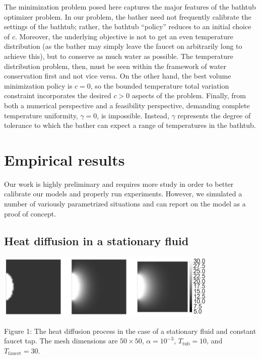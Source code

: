 \documentclass[12pt]{amsart}
\begin{document}
The minimization problem posed here captures the major features of the bathtub
optimizer problem. In our problem, the bather need not frequently calibrate the
settings of the bathtub; rather, the bathtub ``policy'' reduces to an initial
choice of $c$. Moreover, the underlying objective is not to get an even temperature
distribution (as the bather may simply leave the faucet on arbitrarily long to
achieve this), but to conserve as much water as possible. The temperature
distribution problem, then, must be seen within the framework of water
conservation first and not vice versa. On the other hand, the best volume
minimization policy is $c=0$, so the bounded temperature total variation
constraint incorporates the desired $c > 0$ aspects of the problem. Finally,
from both a numerical perspective and a feasibility perspective, demanding
complete temperature uniformity, $\gamma = 0$, is impossible. Instead, $\gamma$
represents the degree of tolerance to which the bather can expect a range of
temperatures in the bathtub.

\section{Empirical results}

Our work is highly preliminary and requires more study in order to better
calibrate our models and properly run experiments. However, we simulated a
number of variously parametrized situations and can report on the model as a
proof of concept.

\subsection{Heat diffusion in a stationary fluid}

\begin{center}
\includegraphics[width=0.8\textwidth]{../plots/diffusion-01.png}

\justify
\footnotesize{
Figure 1: The heat diffusion process in the case of a stationary fluid and
constant faucet tap. The mesh
dimensions are $50 \times 50$, $\alpha = 10^{-3}$, $T_{\mathrm{tub}} = 10$, and
$T_{\mathrm{faucet}} = 30$.}
\end{center}
\end{document}
